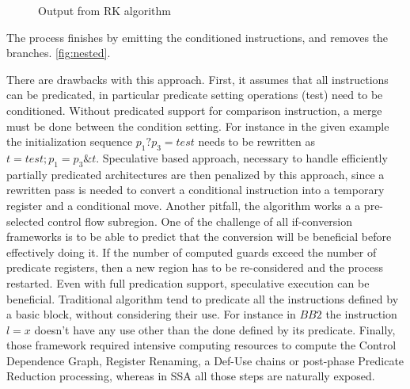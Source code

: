 \begin{figure}
\footnotesize
\caption{Output from RK algorithm}
\label{fig:RK}
\end{figure}

The process finishes by emitting the conditioned instructions, and removes the branches. \ref{fig:nested}. 

There are drawbacks with this approach. First, it assumes that all instructions can be predicated, in particular predicate setting operations (test) need to be conditioned. Without predicated support for comparison instruction, a merge must be done between the condition setting. For instance in the given example the initialization sequence $p_1 ? p_3=test$ needs to be rewritten as $t=test; p_1=p_3 \& t$. Speculative based approach, necessary to handle efficiently partially predicated architectures are then penalized by this approach, since a rewritten pass is needed to convert a conditional instruction into a temporary register and a conditional move.
Another pitfall, the algorithm works a a pre-selected control flow subregion. One of the challenge of all if-conversion frameworks is to be able to predict that the conversion will be beneficial before effectively doing it. If the number of computed guards exceed the number of predicate registers, then a new region has to be re-considered and the process restarted. Even with full predication support, speculative execution can be beneficial. Traditional algorithm tend to predicate all the instructions defined by a basic block, without considering their use. For instance in $BB2$ the instruction $l=x$ doesn't have any use other than the done defined by its predicate. Finally, those framework required intensive computing resources to compute the Control Dependence Graph, Register Renaming, a Def-Use chains or post-phase Predicate Reduction processing, whereas in SSA all those steps are naturally exposed.

